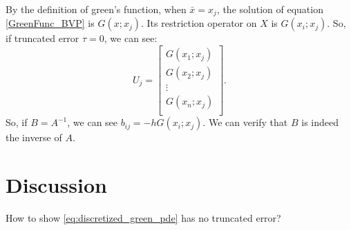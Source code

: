 \documentclass{article}
\theoremstyle{plain}
\theoremstyle{definition}
\theoremstyle{remark}
\begin{document}
By the definition of green's function, when $\bar{x}=x_{j}$, the solution of equation \eqref{GreenFunc_BVP} is $G(x;x_{j})$. Its restriction operator on $X$ is $G(x_{i};x_{j})$. So, if truncated error $\tau=0$, we can see: 
\begin{equation}
    U_{j}=\begin{bmatrix}
        G(x_{1};x_{j})\\
        G(x_{2};x_{j})\\
        \vdots\\
        G(x_{n};x_{j})\\
    \end{bmatrix}.
\end{equation}
So, if $B=A^{-1}$, we can see $b_{ij}=-hG(x_{i};x_{j})$. We can verify that $B$ is indeed the inverse of $A$.
\section{Discussion}
How to show \eqref{eq:discretized_green_pde} has no truncated error?
\end{document}
